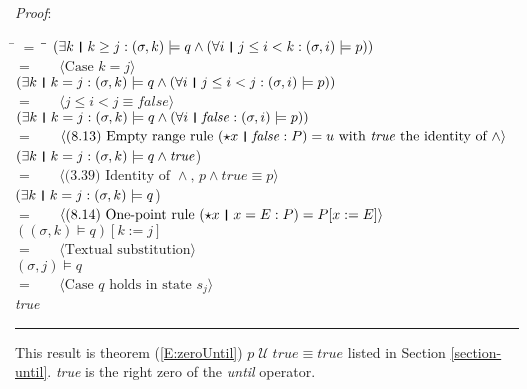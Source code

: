 \documentclass[12pt, fleqn, leqno]{article}
\newcommand{\lgap}{2pt}                             %
\newcommand{\mymathindent}{24pt}                    %
\newcommand{\Until}{\;\mathcal{U}\;}
\newcommand{\myqed}{\rule[-.23ex]{1.2ex}{2.0ex}}
\newcommand{\myqedtab}{\hspace{384pt}}              %
\newcommand{\thedr}{\rule[-.25ex]{.32mm}{1.75ex}}   %
\newcommand{\dr}{\;\,\thedr\,\;}                    %
\newcommand{\rb}{:}                                 %
\newcommand{\all}{\forall}                          %
\newcommand{\ext}{\exists}                          %
\newcommand{\Gll} {\langle}                         %
\newcommand{\Ggg} {\rangle}                         %
\newcommand{\Hint}[1]     {\ \ \ $\Gll              \mbox{#1} \Ggg$ }   %
\begin{document}
\emph{Proof}:
\begin{tabbing}
\hspace{\mymathindent} \= $= \;$ \= \myqedtab \= \kill
	\> \>   $(\ext k \dr k \ge j \rb (\sigma,k) \models q \land (\all i \dr j\le i < k \rb (\sigma,i) \models p))$\\[\lgap]
	\> $=$  \>  \Hint{Case $k=j$}\\[\lgap]
	\> \>   $(\ext k \dr k=j \rb (\sigma,k) \models q \land (\all i \dr j\le i < j \rb (\sigma,i) \models p))$\\[\lgap]
	\> $=$  \>  \Hint{$j\le i < j \equiv \mathit{false}$}\\[\lgap]
	\> \>   $(\ext k \dr k=j \rb (\sigma,k) \models q \land (\all i \dr \mathit{false} \rb (\sigma,i) \models p))$\\[\lgap]
	\> $=$  \>  \Hint{(8.13) Empty range rule $(\star x \dr \mathit{false} \rb P) =u$ with \textit{true} the identity of $\land$}\\[\lgap]
	\> \>   $(\ext k \dr k=j \rb (\sigma,k) \models q \land \mathit{true}$)\\[\lgap]
	\> $=$  \>  \Hint{(3.39) Identity of $\land$, $p \land \mathit{true} \equiv p$}\\[\lgap]
	\> \>   $(\ext k \dr k=j \rb (\sigma,k) \models q$)\\[\lgap]
	\> $=$  \>  \Hint{(8.14) One-point rule $(\star x\dr x=E\rb P) = P[x:=E]$}\\[\lgap]
	\> \>   $((\sigma,k) \models q)[k := j]$\\[\lgap]
	\> $=$  \>  \Hint{Textual substitution}\\[\lgap]
	\> \>   $(\sigma,j) \models q$\\[\lgap]
	\> $=$  \>  \Hint{Case $q$ holds in state $s_j$}\\[\lgap]
	\> \>   \textit{true} \quad \myqed
\end{tabbing}
This result is theorem (\ref{E:zeroUntil}) $p \Until \mathit{true} \equiv \mathit{true}$ listed in Section \ref{section-until}.
\textit{true} is the right zero of the \textit{until} operator.
\end{document}
